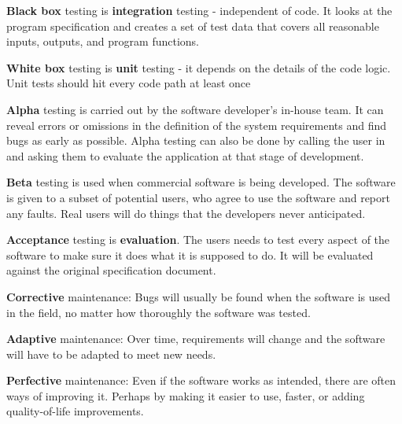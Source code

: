 \documentclass[../main.tex]{subfile}
\begin{document}


\textbf{Black box} testing is \textbf{integration} testing - independent of code. It looks at the program specification and creates a set of test data that covers all reasonable inputs, outputs, and program functions.

\textbf{White box} testing is \textbf{unit} testing - it depends on the details of the code logic. Unit tests should hit every code path at least once

\textbf{Alpha} testing is carried out by the software developer's in-house team. It can reveal errors or omissions in the definition of the system requirements and find bugs as early as possible. Alpha testing can also be done by calling the user in and asking them to evaluate the application at that stage of development. 

\textbf{Beta} testing is used when commercial software is being developed. The software is given to a subset of potential users, who agree to use the software and report any faults. Real users will do things that the developers never anticipated.

\textbf{Acceptance} testing is \textbf{evaluation}. The users needs to test every aspect of the software to make sure it does what it is supposed to do. It will be evaluated against the original specification document.


\textbf{Corrective} maintenance: Bugs will usually be found when the software is used in the field, no matter how thoroughly the software was tested.

\textbf{Adaptive} maintenance: Over time, requirements will change and the software will have to be adapted to meet new needs.

\textbf{Perfective} maintenance: Even if the software works as intended, there are often ways of improving it. Perhaps by making it easier to use, faster, or adding quality-of-life improvements.
\end{document}
